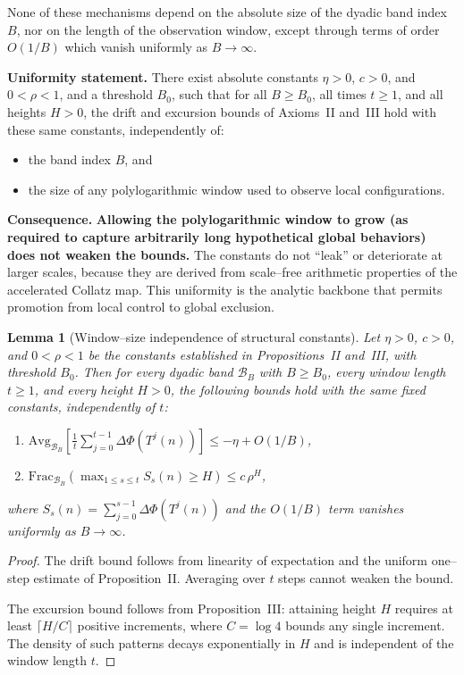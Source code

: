 \documentclass[preprint,12pt]{elsarticle}
\newtheorem{lemma}{Lemma}
\newcommand{\BandFrac}[2]{\mathrm{Frac}_{#1}\!\left(#2\right)} %
\newcommand{\BandAvg}[2]{\mathrm{Avg}_{#1}\!\left[#2\right]}  %
\begin{document}
None of these mechanisms depend on the absolute size of the dyadic band index
$B$, nor on the length of the observation window, except through terms of order
$O(1/B)$ which vanish uniformly as $B \to \infty$.

\medskip

\noindent\textbf{Uniformity statement.}
There exist absolute constants $\eta>0$, $c>0$, and $0<\rho<1$, and a threshold
$B_0$, such that for all $B \ge B_0$, all times $t \ge 1$, and all heights $H>0$,
the drift and excursion bounds of Axioms~II and~III hold with these same
constants, independently of:
\begin{itemize}
\item the band index $B$, and
\item the size of any polylogarithmic window used to observe local configurations.
\end{itemize}

\medskip

\noindent\textbf{Consequence.} \textbf{Allowing the polylogarithmic window to grow (as required to capture arbitrarily long hypothetical global behaviors) does not weaken the bounds.} The constants do not ``leak'' or deteriorate at larger scales, because they are derived from scale--free arithmetic properties of the accelerated Collatz map. This uniformity is the analytic backbone that permits promotion from local control to global exclusion.

\medskip

\begin{lemma}[Window--size independence of structural constants]
\label{lem:window-independence}
Let $\eta>0$, $c>0$, and $0<\rho<1$ be the constants established in
Propositions~II and~III, with threshold $B_0$.
Then for every dyadic band $\mathcal{B}_B$ with $B \ge B_0$, every window length
$t \ge 1$, and every height $H>0$, the following bounds hold with the same fixed
constants, independently of $t$:
\begin{enumerate}
\item[(i)] $\displaystyle
\BandAvg{\mathcal{B}_B}{\frac{1}{t}
\sum_{j=0}^{t-1}\Delta\Phi(T^j(n))}
\le -\eta + O(1/B)$,
\item[(ii)] $\displaystyle
\BandFrac{\mathcal{B}_B}{\max_{1\le s\le t} S_s(n) \ge H} \le c\,\rho^H$,
\end{enumerate}
where $S_s(n)=\sum_{j=0}^{s-1}\Delta\Phi(T^j(n))$ and the $O(1/B)$ term vanishes
uniformly as $B\to\infty$.
\end{lemma}

\begin{proof}
The drift bound follows from linearity of expectation and the uniform one--step
estimate of Proposition~II. Averaging over $t$ steps cannot weaken the bound.

The excursion bound follows from Proposition~III: attaining height $H$ requires
at least $\lceil H/C\rceil$ positive increments, where $C=\log 4$ bounds any
single increment. The density of such patterns decays exponentially in $H$ and
is independent of the window length $t$.
\end{proof}
\end{document}
